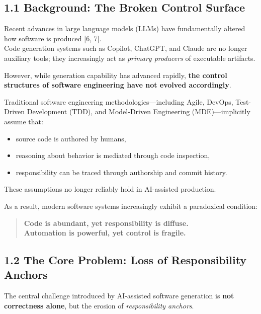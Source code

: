 \documentclass[
]{article}
\begin{document}
\hypertarget{11-background-the-broken-control-surface}{%
\subsection{1.1 Background: The Broken Control
Surface}\label{11-background-the-broken-control-surface}}

Recent advances in large language models (LLMs) have fundamentally
altered how software is produced {[}6, 7{]}.\\
Code generation systems such as Copilot, ChatGPT, and Claude are no
longer auxiliary tools; they increasingly act as \emph{primary
producers} of executable artifacts.

However, while generation capability has advanced rapidly, \textbf{the
control structures of software engineering have not evolved
accordingly}.

Traditional software engineering methodologies---including Agile,
DevOps, Test-Driven Development (TDD), and Model-Driven Engineering
(MDE)---implicitly assume that:

\begin{itemize}
\item
  source code is authored by humans,
\item
  reasoning about behavior is mediated through code inspection,
\item
  responsibility can be traced through authorship and commit history.
\end{itemize}

These assumptions no longer reliably hold in AI-assisted production.

As a result, modern software systems increasingly exhibit a paradoxical
condition:

\begin{quote}
\textbf{Code is abundant, yet responsibility is diffuse.\\
Automation is powerful, yet control is fragile.}
\end{quote}

\hypertarget{12-the-core-problem-loss-of-responsibility-anchors}{%
\subsection{1.2 The Core Problem: Loss of Responsibility
Anchors}\label{12-the-core-problem-loss-of-responsibility-anchors}}

The central challenge introduced by AI-assisted software generation is
\textbf{not correctness alone}, but the erosion of \emph{responsibility
anchors}.
\end{document}

